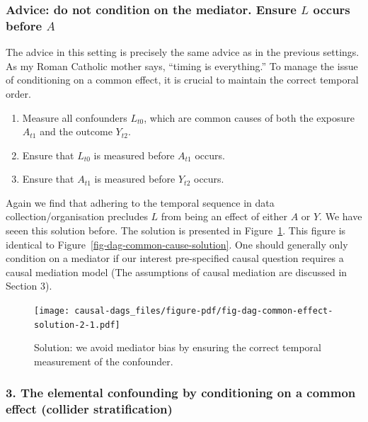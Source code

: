 \documentclass[
  singlecolumn,
  9pt]{article}
\providecommand{\tightlist}{%
  \setlength{\itemsep}{0pt}\setlength{\parskip}{0pt}}\usepackage{longtable,booktabs,array}
\begin{document}
\subsubsection{\texorpdfstring{Advice: do not condition on the mediator.
Ensure \(L\) occurs before
\(A\)}{Advice: do not condition on the mediator. Ensure L occurs before A}}\label{advice-do-not-condition-on-the-mediator.-ensure-l-occurs-before-a}

The advice in this setting is precisely the same advice as in the
previous settings. As my Roman Catholic mother says, ``timing is
everything.'' To manage the issue of conditioning on a common effect, it
is crucial to maintain the correct temporal order.

\begin{enumerate}
\def\labelenumi{\arabic{enumi}.}
\tightlist
\item
  Measure all confounders \(L_{t0}\), which are common causes of both
  the exposure \(A_{t1}\) and the outcome \(Y_{t2}\).
\item
  Ensure that \(L_{t0}\) is measured before \(A_{t1}\) occurs.
\item
  Ensure that \(A_{t1}\) is measured before \(Y_{t2}\) occurs.
\end{enumerate}

Again we find that adhering to the temporal sequence in data
collection/organisation precludes \(L\) from being an effect of either
\(A\) or \(Y\). We have seeen this solution before. The solution is
presented in Figure~\ref{fig-dag-common-effect-solution-2}. This figure
is identical to Figure~\ref{fig-dag-common-cause-solution}. One should
generally only condition on a mediator if our interest pre-specified
causal question requires a causal mediation model (The assumptions of
causal mediation are discussed in Section 3).

\begin{figure}

{\centering \texttt{[image: causal-dags\_files/figure-pdf/fig-dag-common-effect-solution-2-1.pdf]}

}

\caption{\label{fig-dag-common-effect-solution-2}Solution: we avoid
mediator bias by ensuring the correct temporal measurement of the
confounder.}

\end{figure}

\subsubsection{3. The elemental confounding by conditioning on a common
effect (collider
stratification)}\label{the-elemental-confounding-by-conditioning-on-a-common-effect-collider-stratification}
\end{document}
